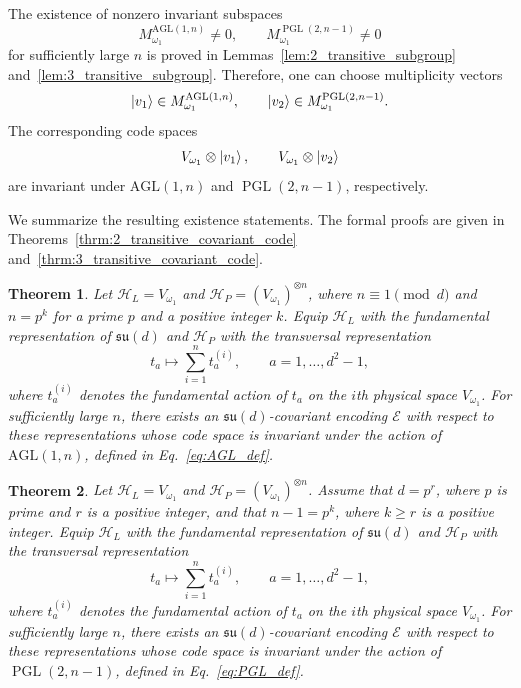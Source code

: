\documentclass[10pt,twocolumn,superscriptaddress,aps,amsmath,amssymb,citeautoscript,floatfix,prx]{revtex4-2}
\newtheorem{theorem}{Theorem}
\theoremstyle{plain}
\theoremstyle{plain}
\theoremstyle{plain}
\theoremstyle{plain}
\theoremstyle{plain}
\theoremstyle{plain}
\theoremstyle{plain}
\theoremstyle{definition}
\theoremstyle{plain}
\begin{document}
The existence of nonzero invariant subspaces
$$
M_{\omega_1}^{\mathrm{AGL}(1,n)}
\neq
0,
\qquad
M_{\omega_1}^{\operatorname{PGL}(2,n-1)}
\neq
0
$$
for sufficiently large $n$ is proved in Lemmas~\ref{lem:2_transitive_subgroup} and~\ref{lem:3_transitive_subgroup}. Therefore, one can choose multiplicity vectors
$$
\ket{v_1}\in M_{\omega_1}^{\mathrm{AGL}(1,n)},
\qquad
\ket{v_2}\in M_{\omega_1}^{\operatorname{PGL}(2,n-1)}.
$$
The corresponding code spaces
$$
V_{\omega_1}\otimes\ket{v_1},
\qquad
V_{\omega_1}\otimes\ket{v_2}
$$
are invariant under $\mathrm{AGL}(1,n)$ and $\operatorname{PGL}(2,n-1)$, respectively.

We summarize the resulting existence statements. The formal proofs are given in Theorems~\ref{thrm:2_transitive_covariant_code} and~\ref{thrm:3_transitive_covariant_code}.

\begin{theorem}\label{thrm:main_2_transitive_covariant_code}
Let $\mathcal H_L=V_{\omega_1}$ and $\mathcal H_P=(V_{\omega_1})^{\otimes n}$, where $n\equiv 1\pmod d$ and $n=p^k$ for a prime $p$ and a positive integer $k$. 
Equip $\mathcal H_L$ with the fundamental representation of $\mathfrak{su}(d)$ and $\mathcal H_P$ with the transversal representation
$$
t_a
\longmapsto
\sum_{i=1}^n t_a^{(i)},
\qquad
a=1,\ldots,d^2-1,
$$
where $t_a^{(i)}$ denotes the fundamental action of $t_a$ on the $i$th physical space $V_{\omega_1}$. 
For sufficiently large $n$, there exists an $\mathfrak{su}(d)$-covariant encoding $\mathcal E$ with respect to these representations whose code space is 
invariant under the action of $\mathrm{AGL}(1,n)$, defined in Eq.~\eqref{eq:AGL_def}.
\end{theorem}

\begin{theorem}\label{thrm:main_3_transitive_covariant_code}
Let $\mathcal H_L=V_{\omega_1}$ and $\mathcal H_P=(V_{\omega_1})^{\otimes n}$. Assume that $d=p^r$, where $p$ is prime and $r$ is a positive integer, 
and that $n-1=p^k$, where $k\ge r$ is a positive integer. Equip $\mathcal H_L$ with the fundamental representation of $\mathfrak{su}(d)$ and $\mathcal H_P$ 
with the transversal representation
$$
t_a
\longmapsto
\sum_{i=1}^n t_a^{(i)},
\qquad
a=1,\ldots,d^2-1,
$$
where $t_a^{(i)}$ denotes the fundamental action of $t_a$ on the $i$th physical space $V_{\omega_1}$. For sufficiently large $n$, there exists an $\mathfrak{su}(d)$-covariant 
encoding $\mathcal E$ with respect to these representations whose code space is invariant under the action of $\operatorname{PGL}(2,n-1)$, defined in Eq.~\eqref{eq:PGL_def}.
\end{theorem}
\end{document}
